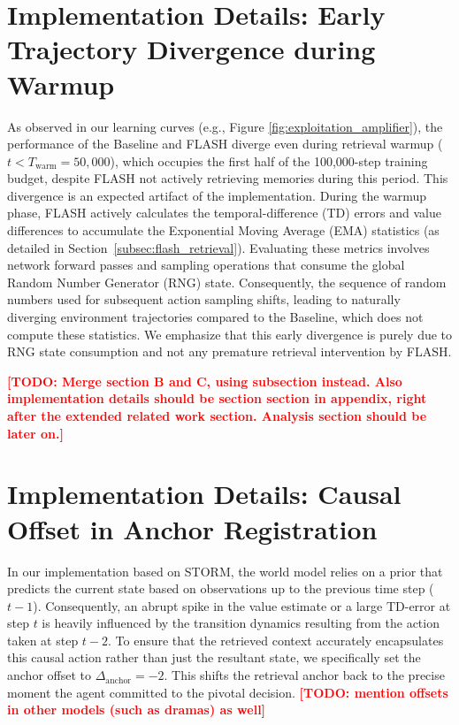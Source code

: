\documentclass{article} %
\newcommand{\todo}[1]{\textcolor{red}{\textbf{[TODO: #1]}}}
\begin{document}
\section{Implementation Details: Early Trajectory Divergence during Warmup}
\label{sec:appendix_rng_divergence}
As observed in our learning curves (e.g., Figure \ref{fig:exploitation_amplifier}), the performance of the Baseline and FLASH diverge even during retrieval warmup ($t < T_{\text{warm}} = 50,000$), which occupies the first half of the 100,000-step training budget, despite FLASH not actively retrieving memories during this period. This divergence is an expected artifact of the implementation. During the warmup phase, FLASH actively calculates the temporal-difference (TD) errors and value differences to accumulate the Exponential Moving Average (EMA) statistics (as detailed in Section~\ref{subsec:flash_retrieval}). Evaluating these metrics involves network forward passes and sampling operations that consume the global Random Number Generator (RNG) state. Consequently, the sequence of random numbers used for subsequent action sampling shifts, leading to naturally diverging environment trajectories compared to the Baseline, which does not compute these statistics. We emphasize that this early divergence is purely due to RNG state consumption and not any premature retrieval intervention by FLASH.

\todo{Merge section B and C, using subsection instead.
Also implementation details should be section section in appendix, right after the extended related work section. Analysis section should be later on.}

\section{Implementation Details: Causal Offset in Anchor Registration}
\label{sec:appendix_causal_anchor}
In our implementation based on STORM, the world model relies on a prior that predicts the current state based on observations up to the previous time step ($t-1$). Consequently, an abrupt spike in the value estimate or a large TD-error at step $t$ is heavily influenced by the transition dynamics resulting from the action taken at step $t-2$. To ensure that the retrieved context accurately encapsulates this causal action rather than just the resultant state, we specifically set the anchor offset to $\Delta_{\text{anchor}} = -2$. This shifts the retrieval anchor back to the precise moment the agent committed to the pivotal decision.
\todo{mention offsets in other models (such as dramas) as well}
\end{document}
